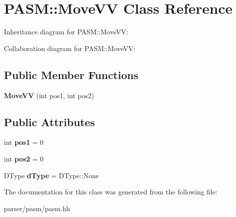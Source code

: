 \hypertarget{classPASM_1_1MoveVV}{}\section{P\+A\+SM\+:\+:Move\+VV Class Reference}
\label{classPASM_1_1MoveVV}


Inheritance diagram for P\+A\+SM\+:\+:Move\+VV\+:


Collaboration diagram for P\+A\+SM\+:\+:Move\+VV\+:
\subsection*{Public Member Functions}
\begin{DoxyCompactItemize}
\item 
\mbox{\label{classPASM_1_1MoveVV_a5ac74cd466d62c43c2846f509d4d2708}} 
{\bfseries Move\+VV} (int pos1, int pos2)
\end{DoxyCompactItemize}
\subsection*{Public Attributes}
\begin{DoxyCompactItemize}
\item 
\mbox{\label{classPASM_1_1MoveVV_ac16577ff2d4737006bc817dfafe5c6df}} 
int {\bfseries pos1} = 0
\item 
\mbox{\label{classPASM_1_1MoveVV_a14facece8cd0d6b61bca46012874b83e}} 
int {\bfseries pos2} = 0
\item 
\mbox{\label{classPASM_1_1MoveVV_aa35b00886712a0b1b637d97aa58975a8}} 
D\+Type {\bfseries d\+Type} = D\+Type\+::\+None
\end{DoxyCompactItemize}


The documentation for this class was generated from the following file\+:\begin{DoxyCompactItemize}
\item 
parser/pasm/pasm.\+hh\end{DoxyCompactItemize}
